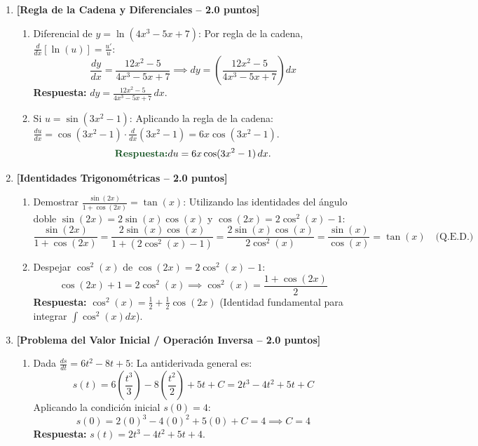 \documentclass[11pt,a4paper]{article}
\begin{document}
\begin{enumerate}[leftmargin=*,itemsep=16pt,label=\textbf{Ejercicio \arabic*.}]
    \item \textbf{[Regla de la Cadena y Diferenciales -- 2.0 puntos]}
    \begin{enumerate}[label=\alph*),itemsep=8pt]
        \item Diferencial de $y = \ln(4x^3 - 5x + 7)$:
        Por regla de la cadena, $\frac{d}{dx}[\ln(u)] = \frac{u'}{u}$:
        \[
        \frac{dy}{dx} = \frac{12x^2 - 5}{4x^3 - 5x + 7} \implies dy = \left( \frac{12x^2 - 5}{4x^3 - 5x + 7} \right) dx
        \]
        {\color{respcolor}\textbf{Respuesta:}} $\displaystyle dy = \frac{12x^2 - 5}{4x^3 - 5x + 7}\,dx$.

        \item Si $u = \sin(3x^2 - 1)$:
        Aplicando la regla de la cadena: $\frac{du}{dx} = \cos(3x^2 - 1) \cdot \frac{d}{dx}(3x^2 - 1) = 6x \cos(3x^2 - 1)$.
        \[
        {\color{respcolor}\textbf{Respuesta:}} \displaystyle du = 6x\cos(3x^2 - 1)\,dx.
        \]
    \end{enumerate}

    \item \textbf{[Identidades Trigonométricas -- 2.0 puntos]}
    \begin{enumerate}[label=\alph*),itemsep=8pt]
        \item Demostrar $\frac{\sin(2x)}{1 + \cos(2x)} = \tan(x)$:
        Utilizando las identidades del ángulo doble $\sin(2x) = 2\sin(x)\cos(x)$ y $\cos(2x) = 2\cos^2(x) - 1$:
        \[
        \frac{\sin(2x)}{1 + \cos(2x)} = \frac{2\sin(x)\cos(x)}{1 + (2\cos^2(x) - 1)} = \frac{2\sin(x)\cos(x)}{2\cos^2(x)} = \frac{\sin(x)}{\cos(x)} = \tan(x) \quad \text{(Q.E.D.)}
        \]
        \item Despejar $\cos^2(x)$ de $\cos(2x) = 2\cos^2(x) - 1$:
        \[
        \cos(2x) + 1 = 2\cos^2(x) \implies \cos^2(x) = \frac{1 + \cos(2x)}{2}
        \]
        {\color{respcolor}\textbf{Respuesta:}} $\displaystyle \cos^2(x) = \frac{1}{2} + \frac{1}{2}\cos(2x)$ \quad (Identidad fundamental para integrar $\int \cos^2(x)dx$).
    \end{enumerate}

    \item \textbf{[Problema del Valor Inicial / Operación Inversa -- 2.0 puntos]}
    \begin{enumerate}[label=\alph*),itemsep=8pt]
        \item Dada $\frac{ds}{dt} = 6t^2 - 8t + 5$:
        La antiderivada general es:
        \[
        s(t) = 6\left(\frac{t^3}{3}\right) - 8\left(\frac{t^2}{2}\right) + 5t + C = 2t^3 - 4t^2 + 5t + C
        \]
        Aplicando la condición inicial $s(0) = 4$:
        \[
        s(0) = 2(0)^3 - 4(0)^2 + 5(0) + C = 4 \implies C = 4
        \]
        {\color{respcolor}\textbf{Respuesta:}} $\displaystyle s(t) = 2t^3 - 4t^2 + 5t + 4$.


\end{enumerate}
\end{enumerate}
\end{document}
